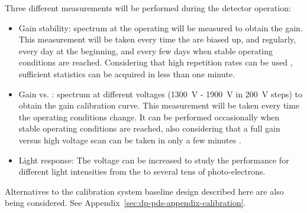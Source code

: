Three different measurements will be performed during the detector operation:
\begin{itemize}
    \item Gain stability:  spectrum at the  operating  will be measured to obtain the gain. This measurement will be taken every time the  are biased up, and regularly, every day at the beginning, and every few days when stable operating conditions are reached. Considering that high  repetition rates can be used \cite{Belver:2019lqm}, sufficient  statistics can be acquired in less than one minute. 
    \item Gain vs. :  spectrum at different  voltages (\SI{1300}{\V} - \SI{1900}{V} in \SI{200}{V} steps) to obtain the gain calibration curve. This measurement will be taken every time the operating conditions change. It can be performed occasionally when stable operating conditions are reached, also considering that a full gain versus high voltage scan can be taken in only a few minutes .  
    \item Light response: The  voltage can be increased to study the  performance for different light intensities from the  to several tens of photo-electrons.
\end{itemize}

Alternatives to the calibration system baseline design described here are also being considered. See Appendix~\ref{sec:dp-pds-appendix-calibration}. 


